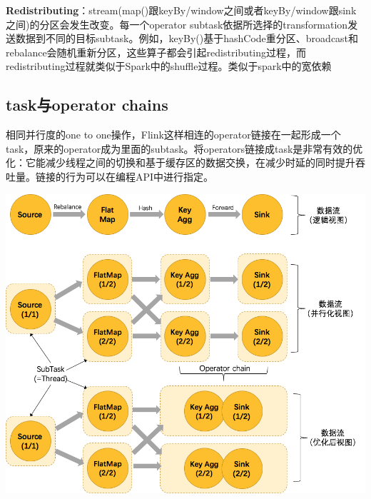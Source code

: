\documentclass{ctexart}
\begin{document}
\textbf{Redistributing}：stream(map()跟keyBy/window之间或者keyBy/window跟sink之间)的分区会发生改变。每一个operator subtask依据所选择的transformation发送数据到不同的目标subtask。例如，keyBy()基于hashCode重分区、broadcast和rebalance会随机重新分区，这些算子都会引起redistributing过程，而redistributing过程就类似于Spark中的shuffle过程。类似于spark中的宽依赖

\subsection{task与operator chains}

相同并行度的one to one操作，Flink这样相连的operator链接在一起形成一个task，原来的operator成为里面的subtask。将operators链接成task是非常有效的优化：它能减少线程之间的切换和基于缓存区的数据交换，在减少时延的同时提升吞吐量。链接的行为可以在编程API中进行指定。

\includegraphics[width=\textwidth]{operatorschains.png}
\end{document}
